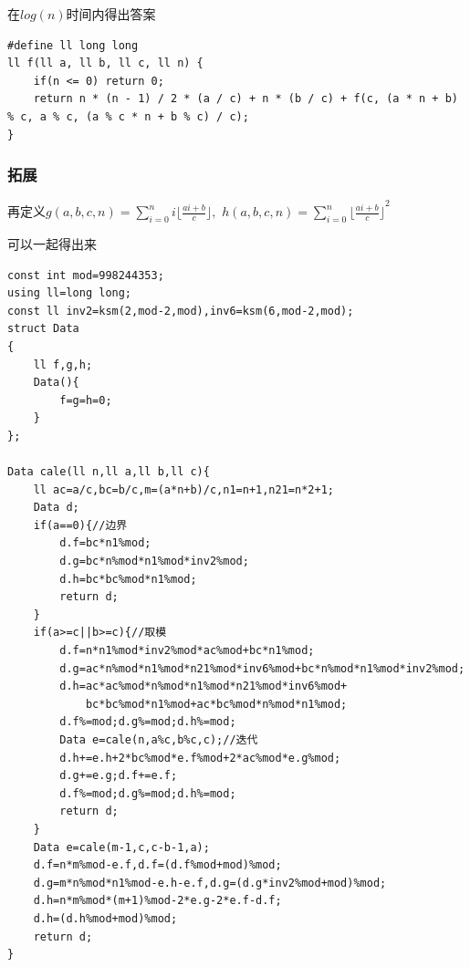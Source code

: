 \documentclass[12pt, a4paper, oneside]{ctexart}
\begin{document}
在${log(n)}$时间内得出答案
\begin{lstlisting}
#define ll long long
ll f(ll a, ll b, ll c, ll n) {
    if(n <= 0) return 0;
    return n * (n - 1) / 2 * (a / c) + n * (b / c) + f(c, (a * n + b) % c, a % c, (a % c * n + b % c) / c);
}
\end{lstlisting}
\subsubsection{拓展}
再定义${g(a,b,c,n)={\sum_{i=0}^n{i\lfloor {\frac{ai+b}{c}} \rfloor}},}$ ${h(a,b,c,n)={\sum_{i=0}^n{\lfloor {\frac{ai+b}{c}}\rfloor}^2}}$

可以一起得出来
\begin{lstlisting}
const int mod=998244353;
using ll=long long;
const ll inv2=ksm(2,mod-2,mod),inv6=ksm(6,mod-2,mod);
struct Data
{
    ll f,g,h;
    Data(){
        f=g=h=0;
    }
};

Data cale(ll n,ll a,ll b,ll c){
    ll ac=a/c,bc=b/c,m=(a*n+b)/c,n1=n+1,n21=n*2+1;
    Data d;
    if(a==0){//边界
        d.f=bc*n1%mod;
        d.g=bc*n%mod*n1%mod*inv2%mod;
        d.h=bc*bc%mod*n1%mod;
        return d;
    }
    if(a>=c||b>=c){//取模
        d.f=n*n1%mod*inv2%mod*ac%mod+bc*n1%mod;
        d.g=ac*n%mod*n1%mod*n21%mod*inv6%mod+bc*n%mod*n1%mod*inv2%mod;
        d.h=ac*ac%mod*n%mod*n1%mod*n21%mod*inv6%mod+
            bc*bc%mod*n1%mod+ac*bc%mod*n%mod*n1%mod;
        d.f%=mod;d.g%=mod;d.h%=mod;
        Data e=cale(n,a%c,b%c,c);//迭代
        d.h+=e.h+2*bc%mod*e.f%mod+2*ac%mod*e.g%mod;
        d.g+=e.g;d.f+=e.f;
        d.f%=mod;d.g%=mod;d.h%=mod;
        return d;
    }
    Data e=cale(m-1,c,c-b-1,a);
    d.f=n*m%mod-e.f,d.f=(d.f%mod+mod)%mod;
    d.g=m*n%mod*n1%mod-e.h-e.f,d.g=(d.g*inv2%mod+mod)%mod;
    d.h=n*m%mod*(m+1)%mod-2*e.g-2*e.f-d.f;
    d.h=(d.h%mod+mod)%mod;
    return d;
}
\end{lstlisting}

\newpage 
\end{document}
